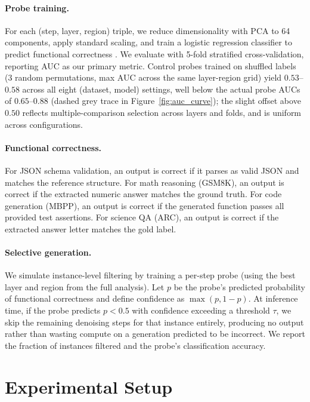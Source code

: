\documentclass[11pt]{article}
\begin{document}
\paragraph{Probe training.}
For each (step, layer, region) triple, we reduce dimensionality with PCA to 64 components, apply standard scaling, and train a logistic regression classifier to predict functional correctness \citep{pedregosa2011scikit}.
We evaluate with 5-fold stratified cross-validation, reporting AUC as our primary metric.
Control probes trained on shuffled labels (3 random permutations, max AUC across the same layer-region grid) yield $0.53$--$0.58$ across all eight (dataset, model) settings, well below the actual probe AUCs of $0.65$--$0.88$ (dashed grey trace in Figure~\ref{fig:auc_curve}); the slight offset above $0.50$ reflects multiple-comparison selection across layers and folds, and is uniform across configurations.

\paragraph{Functional correctness.}
For JSON schema validation, an output is correct if it parses as valid JSON and matches the reference structure.
For math reasoning (GSM8K), an output is correct if the extracted numeric answer matches the ground truth.
For code generation (MBPP), an output is correct if the generated function passes all provided test assertions.
For science QA (ARC), an output is correct if the extracted answer letter matches the gold label.

\paragraph{Selective generation.}
We simulate instance-level filtering by training a per-step probe (using the best layer and region from the full analysis).
Let $p$ be the probe's predicted probability of functional correctness and define confidence as $\max(p, 1-p)$.
At inference time, if the probe predicts $p < 0.5$ with confidence exceeding a threshold $\tau$, we skip the remaining denoising steps for that instance entirely, producing no output rather than wasting compute on a generation predicted to be incorrect.
We report the fraction of instances filtered and the probe's classification accuracy.

\section{Experimental Setup}
\end{document}
